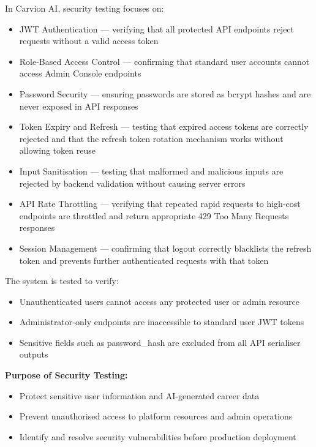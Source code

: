 \documentclass[12pt]{article}
\begin{document}
In Carvion AI, security testing focuses on:

\begin{itemize}
  \item JWT Authentication — verifying that all protected API endpoints reject requests without a valid access token
  \item Role-Based Access Control — confirming that standard user accounts cannot access Admin Console endpoints
  \item Password Security — ensuring passwords are stored as bcrypt hashes and are never exposed in API responses
  \item Token Expiry and Refresh — testing that expired access tokens are correctly rejected and that the refresh token rotation mechanism works without allowing token reuse
  \item Input Sanitisation — testing that malformed and malicious inputs are rejected by backend validation without causing server errors
  \item API Rate Throttling — verifying that repeated rapid requests to high-cost endpoints are throttled and return appropriate 429 Too Many Requests responses
  \item Session Management — confirming that logout correctly blacklists the refresh token and prevents further authenticated requests with that token
\end{itemize}

The system is tested to verify:

\begin{itemize}
  \item Unauthenticated users cannot access any protected user or admin resource
  \item Administrator-only endpoints are inaccessible to standard user JWT tokens
  \item Sensitive fields such as password\_hash are excluded from all API serialiser outputs
\end{itemize}

\textbf{Purpose of Security Testing:}

\begin{itemize}
  \item Protect sensitive user information and AI-generated career data
  \item Prevent unauthorised access to platform resources and admin operations
  \item Identify and resolve security vulnerabilities before production deployment
\end{itemize}
\end{document}
